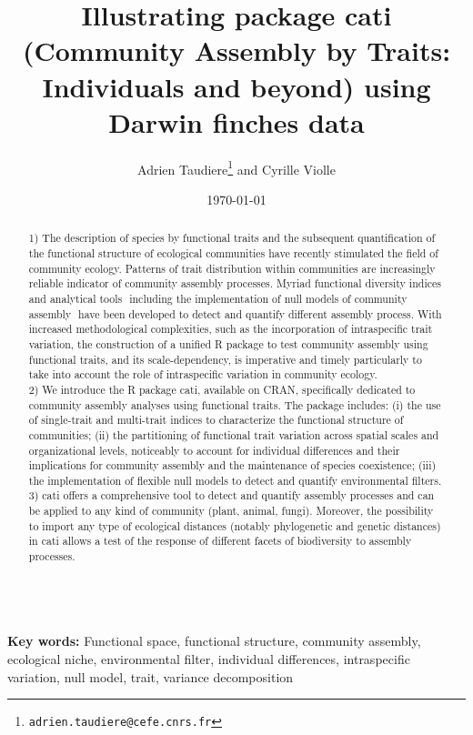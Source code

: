 \documentclass[12pt]{article}\usepackage[]{graphicx}\usepackage[]{color}
\title{Illustrating package cati (Community Assembly by Traits: Individuals and beyond) using Darwin finches data}
\author{Adrien Taudiere\thanks{\texttt{adrien.taudiere@cefe.cnrs.fr}} and Cyrille Violle}
\affil{{\footnotesize CEFE - Centre d'Ecologie Fonctionnelle et Evolutive, Montpellier: France}}
\date{\today}
\begin{document}



\maketitle

\begin{abstract}
1) The description of species by functional traits and the subsequent quantification of the functional structure of ecological communities have recently stimulated the field of community ecology. Patterns of trait distribution within communities are increasingly reliable indicator of community assembly processes. Myriad functional diversity indices and analytical tools  including the implementation of null models of community assembly  have been developed to detect and quantify different assembly process. With increased methodological complexities, such as the incorporation of intraspecific trait variation, the construction of a unified R package to test community assembly using functional traits, and its scale-dependency, is imperative and timely particularly to take into account the role of intraspecific variation in community ecology.
\\

2) We introduce the R package cati, available on CRAN, specifically dedicated to community assembly analyses using functional traits. The package includes: (i) the use of single-trait and multi-trait indices to characterize the functional structure of communities; (ii) the partitioning of functional trait variation across spatial scales and organizational levels, noticeably to account for individual differences and their implications for community assembly and the maintenance of species coexistence; (iii) the implementation of flexible null models to detect and quantify environmental filters.
\\

3) cati offers a comprehensive tool to detect and quantify assembly processes and can be applied to any kind of community (plant, animal, fungi). Moreover, the possibility to import any type of ecological distances (notably phylogenetic and genetic distances) in cati allows a test of the response of different facets of biodiversity to assembly processes.
\end{abstract}

\\
\textbf{Key words:}
Functional space, functional structure, community assembly, ecological niche, environmental filter, individual differences, intraspecific variation, null model, trait, variance decomposition
\end{document}
